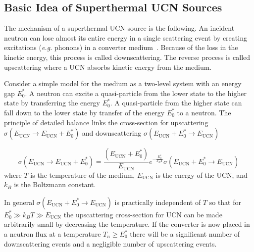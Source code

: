 
 
\subsection{Basic Idea of Superthermal UCN Sources\label{sec:basic_idea}}
The mechanism of a superthermal UCN source is the following.  An
incident neutron can lose almost its entire energy in a single
scattering event by creating excitations ({\it e.g.} phonons) in a
converter medium~\cite{ucnbook, Golub75}. Because of the loss
in the kinetic energy, this process is called downscattering. The
reverse process is called upscattering where a UCN absorbs kinetic
energy from the medium.


Consider a simple model for the medium as a two-level system with an
energy gap $E_0^*$.  A neutron can excite a quasi-particle from the
lower state to the higher state by transferring the energy $E_0^*$. A
quasi-particle from the higher state can fall down to the lower state
by transfer of the energy $E_0^*$ to a neutron.  The principle of
detailed balance links the cross-section for upscattering
$\sigma(E_{\text{UCN}} \rightarrow E_{\text{UCN}}+E_0^*)$ and downscattering
$\sigma(E_{\text{UCN}}+E_0^* \rightarrow E_{\text{UCN}})$~\cite{ucnbook}

\begin{equation}
\label{eqn:detailed_balance}
\sigma(E_{\text{UCN}} \rightarrow E_{\text{UCN}}+E_0^*)= \frac{(E_{\text{UCN}}+E_0^*)}{E_{\text{UCN}}}
e^{-\frac{E_0^*}{k_B T}}\sigma(E_{\text{UCN}}+E_0^* \rightarrow E_{\text{UCN}})
\end{equation}
where $T$ is the temperature of the medium, $E_{\text{UCN}}$ is the
energy of the UCN, and $k_B$ is the Boltzmann constant.

In general $\sigma(E_{\text{UCN}}+E_0^* \rightarrow E_{\text{UCN}})$ is practically
independent of $T$ so that for $E_0^* \gg k_B T \gg E_{\text{UCN}}$ the
upscattering cross-section for UCN can be made arbitrarily small by
decreasing the temperature. If the converter is now placed in a
neutron flux at a temperature $T_n \geq E_0^*$ there will be a
significant number of downscattering events and a negligible number of
upscattering events.

